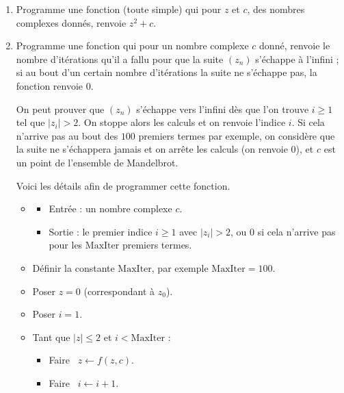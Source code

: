\documentclass[11pt,class=report,crop=false]{standalone}
\begin{document}
\begin{activite}


\begin{enumerate}
  \item Programme une fonction (toute simple)  qui pour $z$ et $c$, des nombres complexes donnés, renvoie $z^2+c$.
  
  \item Programme une fonction  
  qui pour un nombre complexe $c$ donné, renvoie le nombre d'itérations qu'il a fallu pour que la suite $(z_n)$ s'échappe \og{}à l'infini\fg{} ; si au bout d'un certain nombre d'itérations la suite ne s'échappe pas, la fonction renvoie $0$.
  

On peut prouver que $(z_n)$ s'échappe vers l'infini dès que l'on trouve $i\ge1$ tel que $|z_i|>2$. On stoppe alors les calculs et on renvoie l'indice $i$.
Si cela n'arrive pas au bout des $100$ premiers termes par exemple, on considère que la suite ne s'échappera jamais et on arrête les calculs (on renvoie $0$), et $c$ est un point de l'ensemble de Mandelbrot.
  
  Voici les détails afin de programmer cette fonction.
  \begin{algorithme}
  \sauteligne 
 \begin{itemize}
   \item
   \begin{itemize}
     \item Entrée : un nombre complexe $c$.
     \item Sortie : le premier indice $i\ge1$ avec $|z_i|>2$, ou $0$ si cela n'arrive pas pour les $\text{MaxIter}$ premiers termes.
   \end{itemize}

  \item Définir la constante $\text{MaxIter}$, par exemple $\text{MaxIter} = 100$.
  
  \item Poser $z=0$ (correspondant à $z_0$).
  
  \item Poser $i=1$.
         
  \item Tant que $|z| \le 2$ et $i < \text{MaxIter}$ :
       \begin{itemize}
         \item Faire \ $z \leftarrow f(z,c)$.
         \item Faire \ $i \leftarrow i+1$.
       \end{itemize}


\end{itemize}
\end{algorithme}
\end{enumerate}
\end{activite}
\end{document}
